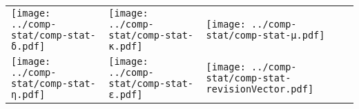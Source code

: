 \documentclass{standalone}
\begin{document}
\begin{tabular}{lll}
\texttt{[image: ../comp-stat/comp-stat-δ.pdf]}&
\texttt{[image: ../comp-stat/comp-stat-κ.pdf]}&
\texttt{[image: ../comp-stat/comp-stat-μ.pdf]}\\
\texttt{[image: ../comp-stat/comp-stat-η.pdf]}&
\texttt{[image: ../comp-stat/comp-stat-ε.pdf]}&
\texttt{[image: ../comp-stat/comp-stat-revisionVector.pdf]}\\
\end{tabular}
\end{document}
